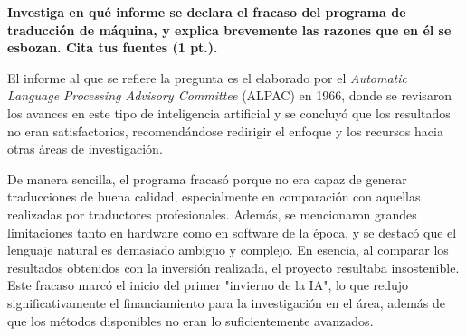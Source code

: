 \textbf{Investiga en qué informe se declara el fracaso del programa de traducción de máquina, y explica brevemente las razones que en él se esbozan. Cita tus fuentes (1 pt.).}

El informe al que se refiere la pregunta es el elaborado por el \textit{Automatic Language Processing Advisory Committee} (ALPAC) en 1966, donde se revisaron los avances en este tipo de inteligencia artificial y se concluyó que los resultados no eran satisfactorios, recomendándose redirigir el enfoque y los recursos hacia otras áreas de investigación. \vspace{.3cm}

De manera sencilla, el programa fracasó porque no era capaz de generar traducciones de buena calidad, especialmente en comparación con aquellas realizadas por traductores profesionales. Además, se mencionaron grandes limitaciones tanto en hardware como en software de la época, y se destacó que el lenguaje natural es demasiado ambiguo y complejo. En esencia, al comparar los resultados obtenidos con la inversión realizada, el proyecto resultaba insostenible. Este fracaso marcó el inicio del primer "invierno de la IA", lo que redujo significativamente el financiamiento para la investigación en el área, además de que los métodos disponibles no eran lo suficientemente avanzados. \vspace{.3cm}

\cite{alpac1966machine}
